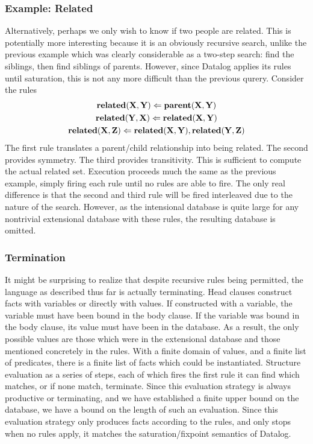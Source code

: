 \subsubsection{Example: Related}
Alternatively, perhaps we only wish to know if two people are related.
This is potentially more interesting because it is an obviously recursive search, unlike the previous example which was clearly considerable as a two-step search: find the siblings, then find siblings of parents.
However, since Datalog applies its rules until saturation, this is not any more difficult than the previous qurery.
Consider the rules
\begin{gather*}
        {\bf related}({\bf X}, {\bf Y}) \Leftarrow {\bf parent}({\bf X}, {\bf Y})\\
        {\bf related}({\bf Y}, {\bf X}) \Leftarrow {\bf related}({\bf X}, {\bf Y})\\
        {\bf related}({\bf X}, {\bf Z}) \Leftarrow {\bf related}({\bf X}, {\bf Y}), {\bf related}({\bf Y}, {\bf Z})
\end{gather*}
The first rule translates a parent/child relationship into being related.
The second provides symmetry.
The third provides transitivity.
This is sufficient to compute the actual related set.
Execution proceeds much the same as the previous example, simply firing each rule until no rules are able to fire.
The only real difference is that the second and third rule will be fired interleaved due to the nature of the search.
However, as the intensional database is quite large for any nontrivial extensional database with these rules, the resulting database is omitted.
\subsubsection{Termination}
It might be surprising to realize that despite recursive rules being permitted, the language as described thus far is actually terminating.
Head clauses construct facts with variables or directly with values.
If constructed with a variable, the variable must have been bound in the body clause.
If the variable was bound in the body clause, its value must have been in the database.
As a result, the only possible values are those which were in the extensional database and those mentioned concretely in the rules.
With a finite domain of values, and a finite list of predicates, there is a finite list of facts which could be instantiated.
Structure evaluation as a series of steps, each of which fires the first rule it can find which matches, or if none match, terminate.
Since this evaluation strategy is always productive or terminating, and we have established a finite upper bound on the database, we have a bound on the length of such an evaluation.
Since this evaluation strategy only produces facts according to the rules, and only stops when no rules apply, it matches the saturation/fixpoint semantics of Datalog.


